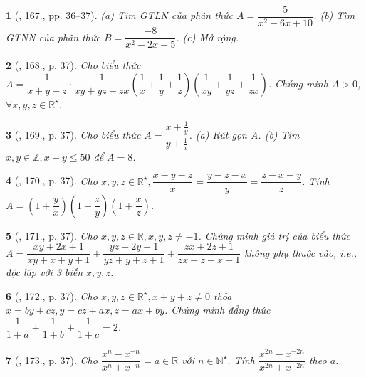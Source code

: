 \documentclass{article}
\newtheorem{baitoan}{}
\begin{document}
\begin{baitoan}[\cite{Tuyen_Toan_8}, 167., pp. 36--37]
	(a) Tìm {\rm GTLN} của phân thức $A = \dfrac{5}{x^2 - 6x + 10}$. (b) Tìm {\rm GTNN} của phân thức $B = \dfrac{-8}{x^2 - 2x + 5}$. (c) Mở rộng.
\end{baitoan}

\begin{baitoan}[\cite{Tuyen_Toan_8}, 168., p. 37]
	Cho biểu thức $A = \dfrac{1}{x + y + z}\cdot\dfrac{1}{xy + yz + zx}\left(\dfrac{1}{x} + \dfrac{1}{y} + \dfrac{1}{z}\right)\left(\dfrac{1}{xy} + \dfrac{1}{yz} + \dfrac{1}{zx}\right)$. Chứng minh $A > 0$, $\forall x,y,z\in\mathbb{R}^\star$.
\end{baitoan}

\begin{baitoan}[\cite{Tuyen_Toan_8}, 169., p. 37]
	Cho biểu thức $A = \dfrac{x + \frac{1}{y}}{y + \frac{1}{x}}$. (a) Rút gọn A. (b) Tìm $x,y\in\mathbb{Z},x + y\le50$ để $A = 8$.
\end{baitoan}

\begin{baitoan}[\cite{Tuyen_Toan_8}, 170., p. 37]
	Cho $x,y,z\in\mathbb{R}^\star,\dfrac{x - y - z}{x} = \dfrac{y - z - x}{y} = \dfrac{z - x - y}{z}$. Tính\\$A = \left(1 + \dfrac{y}{x}\right)\left(1 + \dfrac{z}{y}\right)\left(1 + \dfrac{x}{z}\right)$.
\end{baitoan}

\begin{baitoan}[\cite{Tuyen_Toan_8}, 171., p. 37]
	Cho $x,y,z\in\mathbb{R},x,y,z\ne-1$. Chứng minh giá trị của biểu thức $A = \dfrac{xy + 2x + 1}{xy + x + y + 1}  + \dfrac{yz + 2y + 1}{yz + y + z + 1} + \dfrac{zx + 2z + 1}{zx + z + x + 1}$ không phụ thuộc vào, i.e., độc lập với 3 biến $x,y,z$.
\end{baitoan}

\begin{baitoan}[\cite{Tuyen_Toan_8}, 172., p. 37]
	Cho $x,y,z\in\mathbb{R}^\star,x + y + z\ne0$ thỏa $x = by + cz,y = cz + ax,z = ax + by$. Chứng minh đẳng thức $\dfrac{1}{1 + a} + \dfrac{1}{1 + b} + \dfrac{1}{1 + c} = 2$.
\end{baitoan}

\begin{baitoan}[\cite{Tuyen_Toan_8}, 173., p. 37]
	Cho $\dfrac{x^n - x^{-n}}{x^n + x^{-n}} = a\in\mathbb{R}$ với $n\in\mathbb{N}^\star$. Tính $\dfrac{x^{2n} - x^{-2n}}{x^{2n} + x^{-2n}}$ theo $a$.
\end{baitoan}
\end{document}
